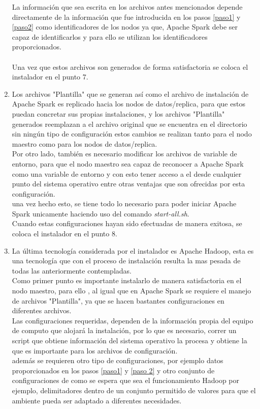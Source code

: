\begin{enumerate}
	La información que sea escrita en los archivos antes mencionados depende directamente de la información que fue introducida en los pasos \ref{paso1} y \ref{paso2} como identificadores de los nodos ya que, Apache Spark debe ser capaz de identificarlos y para ello se utilizan los identificadores proporcionados.\\
	\\
	Una vez que estos archivos son generados de forma satisfactoria se coloca el instalador en el punto 7.
	\item 
	Los archivos "Plantilla" que se generan así como el archivo de instalación de Apache Spark es replicado hacia los nodos de datos/replica, para que estos puedan concretar sus propias instalaciones, y los archivos "Plantilla" generados reemplazan a el archivo original que se encuentra en el directorio sin ningún tipo de configuración estos cambios se realizan tanto para el nodo maestro como para los nodos de datos/replica. 
	\\
	Por otro lado, también es necesario modificar los archivos de variable de entorno, para que el nodo maestro sea capaz de reconocer a Apache Spark como una variable de entorno y con esto tener acceso a el desde cualquier punto del sistema operativo entre otras ventajas que son ofrecidas por esta configuración.
	\\
	una vez hecho esto, se tiene todo lo necesario para poder iniciar Apache Spark unicamente haciendo uso del comando \emph{start-all.sh}.
	\\
	Cuando estas configuraciones hayan sido efectuadas de manera exitosa, se coloca el instalador en el punto 8.
	\item La última tecnología considerada por el instalador es Apache Hadoop, esta es una tecnología que con el proceso de instalación resulta la mas pesada de todas las anteriormente contempladas. \\
	Como primer punto es importante instalarlo de manera satisfactoria en el nodo maestro, para ello , al igual que en Apache Spark se requiere el manejo de archivos "Plantilla", ya que se hacen bastantes configuraciones en diferentes archivos. \\
	Las configuraciones requeridas, dependen de la información propia del equipo de computo que alojará la instalación, por lo que es necesario, correr un script que obtiene información del sistema operativo la procesa y obtiene la que es importante para los archivos de configuración.
	\\
	además se requieren otro tipo de configuraciones, por ejemplo datos proporcionados en los pasos \ref{paso1} y \ref{paso 2} y otro conjunto de configuraciones de como se espera que sea el funcionamiento Hadoop por ejemplo, delimitadores dentro de un conjunto permitido de valores para que el ambiente pueda ser adaptado a diferentes necesidades.

\end{enumerate}
